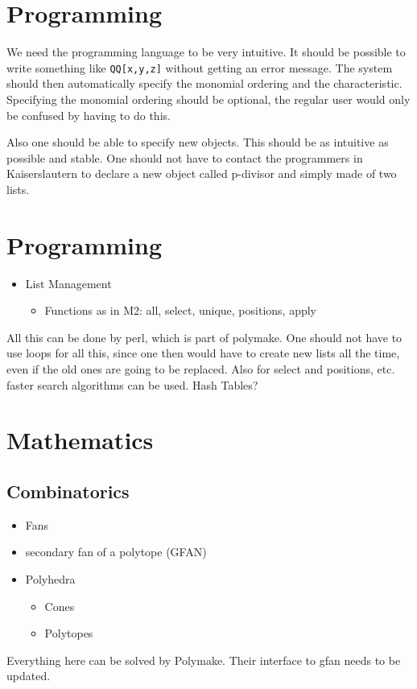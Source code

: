 \documentclass[a4paper]{article}
\begin{document}
\section{Programming}
We need the programming language to be very intuitive.
It should be possible to write something like
{\tt QQ[x,y,z]} without getting an error message. The system should then automatically specify the monomial ordering and the characteristic.
Specifying the monomial ordering should be optional, the regular user would only be confused by having to do this.

Also one should be able to specify new objects. This should be as intuitive as possible and stable. One should not have to contact the programmers in Kaiserslautern to declare a new object called p-divisor and simply made of two lists.


\section{Programming}
\begin{itemize}
	\item[] List Management
	\begin{itemize}
		\item[] Functions as in M2: all, select, unique, positions, apply
	\end{itemize}
\end{itemize}
All this can be done by perl, which is part of polymake. One should not have to use loops for all this, since one then would have to create new lists all the time, even if the old ones are going to be replaced. Also for select and positions, etc. faster search algorithms can be used. Hash Tables?
\section{Mathematics}
\subsection{Combinatorics}
\begin{itemize}
	\item[] Fans
   \item[] secondary fan of a polytope (GFAN)
	\item[] Polyhedra
	\begin{itemize}
		\item[] Cones
		\item[] Polytopes
	\end{itemize}
\end{itemize}
Everything here can be solved by Polymake. Their interface to gfan needs to be updated.
\end{document}
